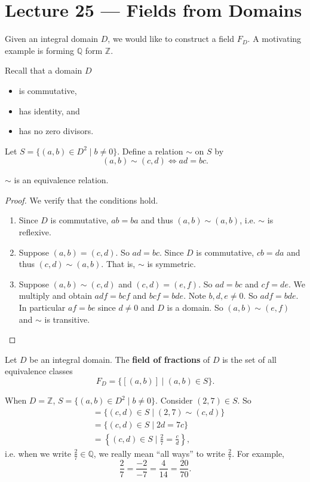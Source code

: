 \section{Lecture 25 — Fields from Domains}

Given an integral domain $D$, we would like to construct a field $F_D$. A motivating example is forming $\mathbb Q$ form $\mathbb Z$.

Recall that a domain $D$
\begin{itemize}
	\item is commutative,
	\item has identity, and
	\item has no zero divisors.
\end{itemize}

Let $S=\{(a,b)\in D^2\mid b\neq 0\}$. Define a relation $\sim$ on $S$ by
$$(a,b)\sim(c,d)\Leftrightarrow ad=bc.$$

\begin{lemma}
	$\sim$ is an equivalence relation.
\end{lemma}

\begin{proof}
	We verify that the conditions hold.
	\begin{enumerate}[label=\textbf{(\alph*)}]
		\item Since $D$ is commutative, $ab=ba$ and thus $(a,b)\sim(a,b)$, i.e. $\sim$ is reflexive.
		\item Suppose $(a,b)=(c,d)$. So $ad=bc$. Since $D$ is commutative, $cb=da$ and thus $(c,d)\sim(a,b)$. That is, $\sim$ is symmetric.
		\item Suppose $(a,b)\sim(c,d)$ and $(c,d)=(e,f)$. So $ad=bc$ and $cf=de$. We multiply and obtain $adf=bcf$ and $bcf=bde$. Note $b,d,e\neq 0$. So $adf=bde$. In particular $af=be$ since $d\neq 0$ and $D$ is a domain. So $(a,b)\sim(e,f)$ and $\sim$ is transitive.
	\end{enumerate}
\end{proof}

\begin{definition}
	Let $D$ be an integral domain. The \textbf{field of fractions} of $D$ is the set of all equivalence classes
	$$F_D=\{[(a,b)]\mid (a,b)\in S\}.$$
\end{definition}

\begin{example}
	When $D=\mathbb Z$, $S=\{(a,b)\in D^2\mid b\neq 0\}$. Consider $(2,7)\in S$. So
	\begin{align*}
		[(2,7)]&=\{(c,d)\in S\mid (2,7)\sim(c,d)\}\\
		&=\{(c,d)\in S\mid 2d=7c\}\\
		&=\left\{(c,d)\in S\mid \frac 27=\frac cd\right\},
	\end{align*}
	i.e. when we write $\frac 27\in \mathbb Q$, we really mean ``all ways'' to write $\frac 27$. For example,
	$$\frac 27=\frac{-2}{-7}=\frac{4}{14}=\frac{20}{70}.$$
\end{example}

